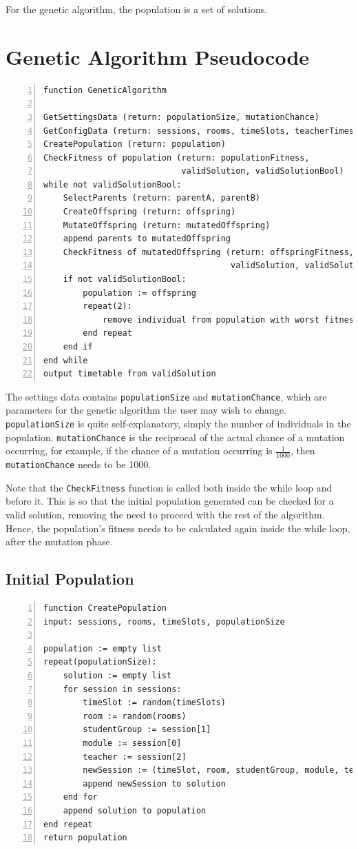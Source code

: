 \documentclass[a4paper, 12pt]{report}
\begin{document}
For the genetic algorithm, the population is a set of solutions.

\section{Genetic Algorithm Pseudocode}

\begin{Verbatim}[numbers=left, fontsize=\footnotesize]
function GeneticAlgorithm

GetSettingsData (return: populationSize, mutationChance)
GetConfigData (return: sessions, rooms, timeSlots, teacherTimes)
CreatePopulation (return: population)
CheckFitness of population (return: populationFitness, 
                            validSolution, validSolutionBool)
while not validSolutionBool:
    SelectParents (return: parentA, parentB)
    CreateOffspring (return: offspring)
    MutateOffspring (return: mutatedOffspring)
    append parents to mutatedOffspring
    CheckFitness of mutatedOffspring (return: offspringFitness, 
                                      validSolution, validSolutionBool)
    if not validSolutionBool:
        population := offspring
        repeat(2):
            remove individual from population with worst fitness
        end repeat
    end if
end while
output timetable from validSolution
\end{Verbatim}

The settings data contains \verb|populationSize| and \verb|mutationChance|, 
which are parameters for the genetic algorithm the user may wish to change.
\verb|populationSize| is quite self-explanatory, simply the number of 
individuals in the population.
\verb|mutationChance| is the reciprocal of the actual chance of a mutation 
occurring, for example, if the chance of a mutation occurring is 
\( \frac{1}{1000} \), then \verb|mutationChance| needs to be 1000.

Note that the \verb|CheckFitness| function is called both inside the while loop
and before it.
This is so that the initial population generated can be checked for a valid 
solution, removing the need to proceed with the rest of the algorithm.
Hence, the population's fitness needs to be calculated again inside the while
loop, after the mutation phase.

\subsection{Initial Population}

\begin{Verbatim}[numbers=left, fontsize=\footnotesize]
function CreatePopulation
input: sessions, rooms, timeSlots, populationSize

population := empty list
repeat(populationSize):
    solution := empty list
    for session in sessions:
        timeSlot := random(timeSlots)
        room := random(rooms)
        studentGroup := session[1]
        module := session[0]
        teacher := session[2]
        newSession := (timeSlot, room, studentGroup, module, teacher)
        append newSession to solution
    end for
    append solution to population
end repeat
return population
\end{Verbatim}
\end{document}
